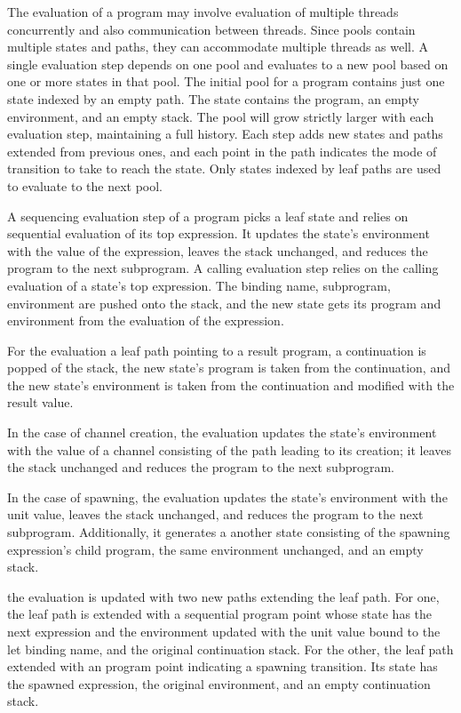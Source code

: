 \documentclass{article}
\begin{document}
The evaluation of a program may involve evaluation of multiple threads concurrently and also
communication between threads. Since pools contain multiple states and paths, they can
accommodate multiple threads as well.  A single evaluation step depends on one pool and
evaluates to a new pool based on one or more states in that pool. The initial pool for a
program contains just one state indexed by an empty path. The state contains the program, an
empty environment, and an empty stack. The pool will grow strictly larger with each evaluation
step, maintaining a full history. Each step adds new states and paths extended from previous
ones, and each point in the path indicates the mode of transition to take to reach the state.
Only states indexed by leaf paths are used to evaluate to the next pool.

A sequencing evaluation step of a program picks a leaf state and relies on
sequential evaluation of its top expression. It updates the state's environment with the
value of the expression, leaves the stack unchanged, and reduces the program to the next
subprogram. A calling evaluation step relies on the calling evaluation of a state's top
expression. The binding name, subprogram, environment are pushed onto the stack, and the new
state gets its program and environment from the evaluation of the expression. 

For the evaluation a leaf path pointing to a result program, a continuation is popped of the
stack, the new state's program is taken from the continuation, and the new state's environment
is taken from the continuation and modified with the result value.

In the case of channel creation, the evaluation updates the state's environment with the
value of a channel consisting of the path leading to its creation; it leaves the stack
unchanged and reduces the program to the next subprogram.

In the case of spawning, the evaluation updates the state's environment with the
unit value, leaves the stack unchanged, and reduces the program to the next subprogram.
Additionally, it generates a another state consisting of the spawning expression's child
program, the same environment unchanged, and an empty stack.

the evaluation is updated with two
new paths extending the leaf path.  For one, the leaf path is extended with a sequential
program point whose state has the next expression and the environment updated
with the unit value bound to
the let binding name, and the original continuation stack. For the other, the leaf path
extended with an program point indicating a spawning transition.  Its state has the spawned
expression, the original environment, and an empty continuation stack. 
\end{document}
